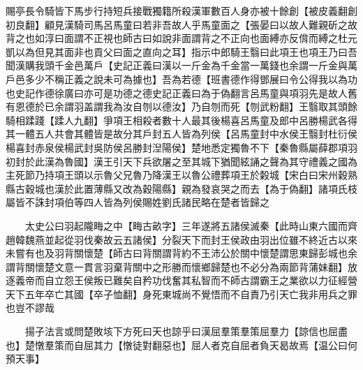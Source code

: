 賜亭長令騎皆下馬步行持短兵接戰獨籍所殺漢軍數百人身亦被十餘創【被皮義翻創初良翻】顧見漢騎司馬呂馬童曰若非吾故人乎馬童面之【張晏曰以故人難親斫之故背之也如淳曰面謂不正視也師古曰如說非面謂背之不正向也面縛亦反偝而縛之杜元凱以為但見其面非也貢父曰面之直向之耳】指示中郎騎王翳曰此項王也項王乃曰吾聞漢購我頭千金邑萬戶【史記正義曰漢以一斤金為千金當一萬錢也余謂一斤金與萬戶邑多少不稱正義之說未可為據也】吾為若德【班書德作得鄧展曰令公得我以為功也史記作德徐廣曰亦可是功德之德史記正義曰為于偽翻言呂馬童與項羽先是故人舊有恩德於已余謂羽盖謂我為汝自刎以德汝】乃自刎而死【刎武粉翻】王翳取其頭餘騎相蹂踐【蹂人九翻】爭項王相殺者數十人最其後楊喜呂馬童及郎中呂勝楊武各得其一體五人共會其體皆是故分其戶封五人皆為列侯【呂馬童封中水侯王翳封杜衍侯楊喜封赤泉侯楊武封吳防侯呂勝封湼陽侯】楚地悉定獨魯不下【秦魯縣屬薛郡項羽初封於此漢為魯國】漢王引天下兵欲屠之至其城下猶聞絃誦之聲為其守禮義之國為主死節乃持項王頭以示魯父兄魯乃降漢王以魯公禮葬項王於糓城【宋白曰宋州穀熟縣古穀城也漢於此置薄縣又改為穀陽縣】親為發哀哭之而去【為于偽翻】諸項氏枝屬皆不誅封項伯等四人皆為列侯賜姓劉氏諸民略在楚者皆歸之

　　太史公曰羽起隴畮之中【畮古畝字】三年遂將五諸侯滅秦【此時山東六國而齊趙韓魏燕並起從羽伐秦故云五諸侯】分裂天下而封王侯政由羽出位雖不終近古以來未嘗有也及羽背關懷楚【師古曰背關謂背約不王沛公於關中懷楚謂思東歸彭城也余謂背關懷楚文意一貫言羽棄背關中之形勝而懷鄉歸楚也不必分為兩節背蒲妹翻】放逐義帝而自立怨王侯叛已難矣自矜功伐奮其私智而不師古謂霸王之業欲以力征經營天下五年卒亡其國【卒子恤翻】身死東城尚不覺悟而不自責乃引天亡我非用兵之罪也豈不謬哉

　　揚子法言或問楚敗垓下方死曰天也諒乎曰漢屈羣策羣策屈羣力【諒信也屈盡也】楚憞羣策而自屈其力【憞徒對翻惡也】屈人者克自屈者負天曷故焉【温公曰何預天事】

